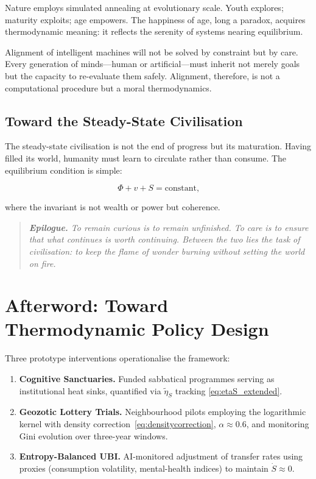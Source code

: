 \documentclass[12pt,a4paper]{article}
\theoremstyle{definition}
\begin{document}
Nature employs simulated annealing at evolutionary scale.  Youth explores;
maturity exploits; age empowers.  The happiness of age, long a paradox,
acquires thermodynamic meaning: it reflects the serenity of systems nearing
equilibrium.

Alignment of intelligent machines will not be solved by constraint but by
care.  Every generation of minds---human or artificial---must inherit not
merely goals but the capacity to re-evaluate them safely.  Alignment,
therefore, is not a computational procedure but a moral thermodynamics.

\subsection{Toward the Steady-State Civilisation}

The steady-state civilisation is not the end of progress but its maturation.
Having filled its world, humanity must learn to circulate rather than consume.
The equilibrium condition is simple:

\begin{equation}
  \Phi + v + S = \text{constant,}
\end{equation}

where the invariant is not wealth or power but coherence.

\medskip
\begin{quote}
  \itshape
  \textbf{Epilogue.} To remain curious is to remain unfinished.  To care is
  to ensure that what continues is worth continuing.  Between the two lies
  the task of civilisation: to keep the flame of wonder burning without
  setting the world on fire.
\end{quote}

\section*{Afterword: Toward Thermodynamic Policy Design}

Three prototype interventions operationalise the framework:

\begin{enumerate}[leftmargin=*]
  \item \textbf{Cognitive Sanctuaries.} Funded sabbatical programmes serving
    as institutional heat sinks, quantified via $\tilde{\eta}_S$ tracking
    \eqref{eq:etaS_extended}.
  \item \textbf{Geozotic Lottery Trials.} Neighbourhood pilots employing the
    logarithmic kernel with density correction~\eqref{eq:densitycorrection},
    $\alpha \approx 0.6$, and monitoring Gini evolution over three-year
    windows.
  \item \textbf{Entropy-Balanced UBI.} AI-monitored adjustment of transfer
    rates using proxies (consumption volatility, mental-health indices) to
    maintain $\dot{S} \approx 0$.
\end{enumerate}
\end{document}
